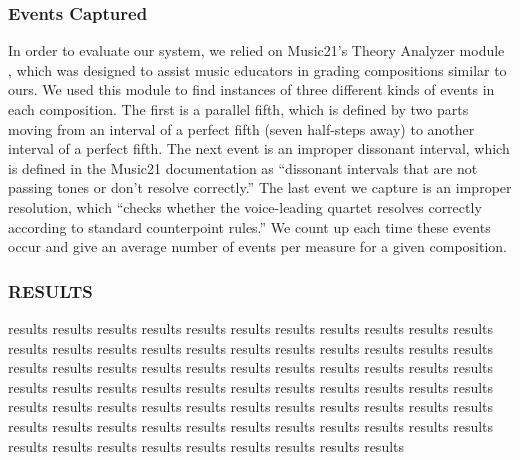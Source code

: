 \documentclass{sig-alternate}
\begin{document}
\subsubsection{Events Captured}
In order to evaluate our system, we relied on Music21's Theory Analyzer module \cite{Cuthbert_music21:a}, which was designed to assist music educators in grading compositions similar to ours. We used this module to find instances of three different kinds of events in each composition. The first is a parallel fifth, which is defined by two parts moving from an interval of a perfect fifth (seven half-steps away) to another interval of a perfect fifth. The next event is an improper dissonant interval, which is defined in the Music21 documentation as ``dissonant intervals that are not passing tones or don't resolve correctly.'' The last event we capture is an improper resolution, which ``checks whether the voice-leading quartet resolves correctly according to standard counterpoint rules.'' We count up each time these events occur and give an average number of events per measure for a given composition. 

\subsubsection{RESULTS}

results results results results results results results results results results results results results results results results results results results results results results results results results results results results results results results results results results results results results results results results results results results results results results results results results results results results results results results results results results results results results results results results results results results results results results results results results results results 
\end{document}
